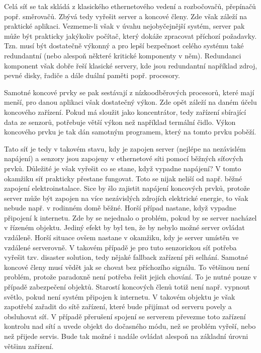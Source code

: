 Celá síť se tak skládá z klasického ethernetového vedení a rozbočovačů, přepínačů popř. směrovačů. Zbývá tedy vyřešit server a koncové členy. Zde však záleží na praktické aplikaci. Vezmeme-li však v úvahu nejobyčejnější systém, server pak může být prakticky jakýkoliv počítač, který dokáže zpracovat příchozí požadavky. Tzn. musí být dostatečně výkonný a pro lepší bezpečnost celého systému také redundantní (nebo alespoň některé kritické komponenty v něm). Redundanci komponent však dobře řeší klasické servery, kde jsou redundantní například zdroj, pevné disky, řadiče a dále duální paměti popř. procesory.

Samotné koncové prvky se pak sestávají z nízkoodběrových procesorů, které mají menší, pro danou aplikaci však dostatečný výkon. Zde opět záleží na daném účelu koncového zařízení. Pokud má sloužit jako koncentrátor, tedy zařízení sbírající data ze senzorů, potřebuje větší výkon než například termální čidlo. Výkon koncového prvku je tak dán samotným programem, který na tomto prvku poběží.

Tato síť je tedy v takovém stavu, kdy je zapojen server (nejlépe na nezávislém napájení) a senzory jsou zapojeny v ethernetové síti pomocí běžných síťových prvků. Důležité je však vyřešit co se stane, když vypadne napájení? V tomto okamžiku síť prakticky přestane fungovat. Toto se nijak neliší od např. běžné zapojení elektroinstalace. Sice by šlo zajistit napájení koncových prvků, protože server může být zapojen na více nezávislých zdrojích elektrické energie, to však nebude např. v rodinném domě běžné. Horší případ nastane, když vypadne připojení k internetu. Zde by se nejednalo o problém, pokud by se server nacházel v řízeném objektu. Jediný efekt by byl ten, že by nebylo možné server ovládat vzdáleně. Horší situace ovšem nastane v okamžiku, kdy je server umístěn ve vzdálené serverovně. V takovém případě je pro tuto senzorickou síť potřeba vyřešit tzv. disaster solution, tedy nějaké fallback zařízení při selhání. Samotné koncové členy musí vědět jak se chovat bez příchozího signálu. To většinou není problém, protože paradoxně není potřeba řešit jejich chování. To je nutné pouze v případě zabezpečení objektů. Starostí koncových členů totiž není např. vypnout světlo, pokud není systém připojen k internetu. V takovém objektu je však zapotřebí zařadit do sítě zařízení, které bude přijímat od serveru povely a obsluhovat síť. V případě přerušení spojení se serverem převezme toto zařízení kontrolu nad sítí a uvede objekt do dočasného módu, než se problém vyřeší, nebo než přijede servis. Bude tak možné i nadále ovládat alespoň na základní úrovni většinu zařízení.


